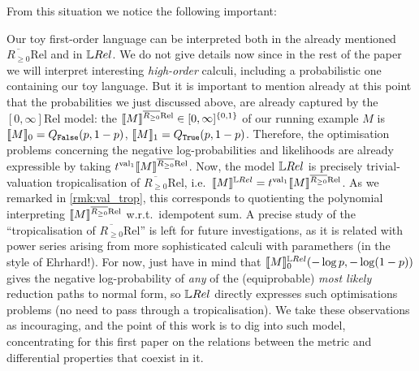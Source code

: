 From this situation we notice the following important:

\begin{remark}\label{rmk:tropof01Rel}
Our toy first-order language can be interpreted both in the already mentioned $\overline{R_{\geq 0}}\mathrm{Rel}$ and in $\LREL$.
We do not give details now since in the rest of the paper we will interpret interesting \emph{high-order} calculi, including a probabilistic one containing our toy language.
But it is important to mention already at this point that the probabilities we just discussed above, are already captured by the $[0,\infty]\mathrm{Rel}$ model: the $\llbracket M\rrbracket^{\overline{R_{\geq 0}}\mathrm{Rel}}\in[0,\infty]^{\{0,1\}}$ of our running example $M$ is $\llbracket M\rrbracket_0=Q_{\mathtt{False}}(p,1-p)$, $\llbracket M\rrbracket_1=Q_{\mathtt{True}}(p,1-p)$.
Therefore, the optimisation problems concerning the negative log-probabilities and likelihoods are already expressible by taking $\trop^{\mathrm{val}_1}\model{M}^{\overline{R_{\geq 0}}\mathrm{Rel}}$. 
Now, the model $\LREL$ is precisely trivial-valuation tropicalisation of $\overline{R_{\geq 0}}\mathrm{Rel}$, i.e.\ $\model{M}^{\LREL}=\trop^{\mathrm{val}_1}\model{M}^{\overline{R_{\geq 0}}\mathrm{Rel}}$.
As we remarked in \autoref{rmk:val_trop}, this corresponds to quotienting the polynomial interpreting $\llbracket M\rrbracket^{\overline{R_{\geq 0}}\mathrm{Rel}}$ w.r.t.\ idempotent sum.
A precise study of the ``tropicalisation of $\overline{R_{\geq 0}}\mathrm{Rel}$'' is left for future investigations, as it is related with power series arising from more sophisticated calculi with paramethers (in the style of \cite{} {\color{red}Ehrhard!}).
For now, just have in mind that $\model{M}^{\LREL}_0(-\log p,-\log (1-p))$ gives the negative log-probability of \emph{any} of the (equiprobable) \emph{most likely} reduction paths to normal form, so $\LREL$ directly expresses such optimisations problems (no need to pass through a tropicalisation).
We take these observations as incouraging, and the point of this work is to dig into such model, concentrating for this first paper on the relations between the metric and differential properties that coexist in it.
\end{remark}


